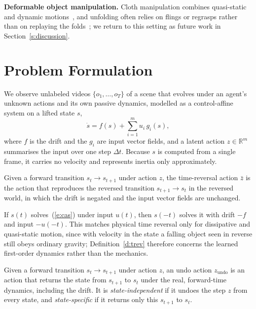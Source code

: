 \documentclass{jcse}
\newcommand{\zb}{\bar{z}}
\newcommand{\zundo}{z_{\mathrm{undo}}}
\newcommand{\R}{\mathbb{R}}
\begin{document}
\textbf{Deformable object manipulation.}
Cloth manipulation combines quasi-static and dynamic motions~\cite{lin2020softgym,lin2021vcd}, and unfolding often relies on flings or regrasps rather than on replaying the folds~\cite{ha2021flingbot,avigal2022speedfolding}; we return to this setting as future work in Section~\ref{s:discussion}.

\section{Problem Formulation} \label{s:problem}

We observe unlabeled videos $\{o_1,\dots,o_T\}$ of a scene that evolves under an agent's unknown actions and its own passive dynamics, modelled as a control-affine system on a lifted state $s$,
\begin{equation}
\dot{s}=f(s)+\sum_{i=1}^m u_i\,g_i(s),
\label{e:cas}
\end{equation}
where $f$ is the drift and the $g_i$ are input vector fields, and a latent action $z\in\R^m$ summarises the input over one step $\Delta t$.
Because $s$ is computed from a single frame, it carries no velocity and represents inertia only approximately.

\begin{definition}
\label{d:trev}
Given a forward transition $s_t\to s_{t+1}$ under action $z$, the time-reversal action $\zb$ is the action that reproduces the reversed transition $s_{t+1}\to s_t$ in the reversed world, in which the drift is negated and the input vector fields are unchanged.
\end{definition}

If $s(t)$ solves~(\ref{e:cas}) under input $u(t)$, then $s(-t)$ solves it with drift $-f$ and input $-u(-t)$.
This matches physical time reversal only for dissipative and quasi-static motion, since with velocity in the state a falling object seen in reverse still obeys ordinary gravity; Definition~\ref{d:trev} therefore concerns the learned first-order dynamics rather than the mechanics.

\begin{definition}
\label{d:undo}
Given a forward transition $s_t\to s_{t+1}$ under action $z$, an undo action $\zundo$ is an action that returns the state from $s_{t+1}$ to $s_t$ under the real, forward-time dynamics, including the drift.
It is \emph{state-independent} if it undoes the step $z$ from every state, and \emph{state-specific} if it returns only this $s_{t+1}$ to $s_t$.
\end{definition}
\end{document}
